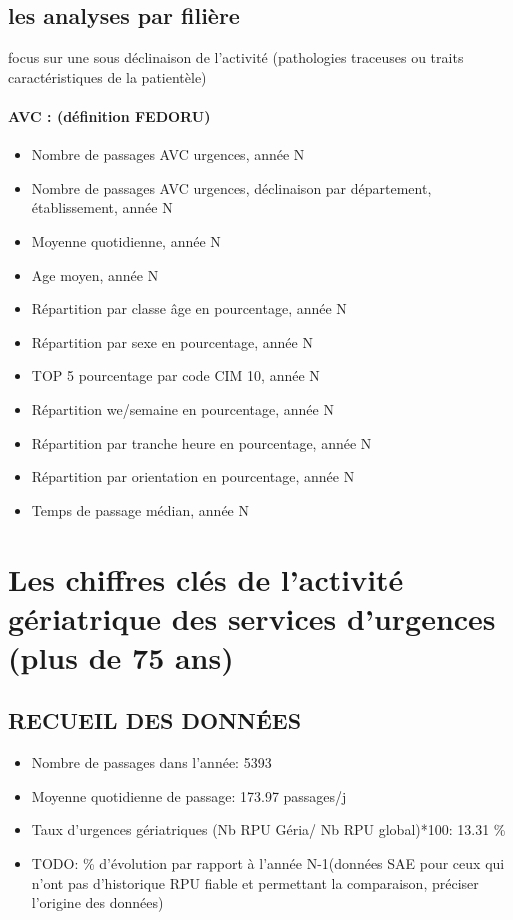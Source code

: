 \documentclass[]{article}
\begin{document}
\subsection{les analyses par filière}\label{les-analyses-par-filiere}

focus sur une sous déclinaison de l'activité (pathologies traceuses ou
traits caractéristiques de la patientèle)

\paragraph{AVC : (définition FEDORU)}\label{avc-definition-fedoru}

\begin{itemize}
\itemsep1pt\parskip0pt
\item
  Nombre de passages AVC urgences, année N
\item
  Nombre de passages AVC urgences, déclinaison par département,
  établissement, année N
\item
  Moyenne quotidienne, année N
\item
  Age moyen, année N
\item
  Répartition par classe âge en pourcentage, année N
\item
  Répartition par sexe en pourcentage, année N
\item
  TOP 5 pourcentage par code CIM 10, année N
\item
  Répartition we/semaine en pourcentage, année N
\item
  Répartition par tranche heure en pourcentage, année N
\item
  Répartition par orientation en pourcentage, année N
\item
  Temps de passage médian, année N
\end{itemize}

\section{Les chiffres clés de l'activité gériatrique des services
d'urgences (plus de 75
ans)}\label{les-chiffres-cles-de-lactivite-geriatrique-des-services-durgences-plus-de-75-ans}

\subsection{RECUEIL DES DONNÉES}\label{recueil-des-donnees-1}

\begin{itemize}
\itemsep1pt\parskip0pt
\item
  Nombre de passages dans l'année: 5393
\item
  Moyenne quotidienne de passage: 173.97 passages/j
\item
  Taux d'urgences gériatriques (Nb RPU Géria/ Nb RPU global)*100: 13.31
  \%
\item
  TODO: \% d'évolution par rapport à l'année N-1(données SAE pour ceux
  qui n'ont pas d'historique RPU fiable et permettant la comparaison,
  préciser l'origine des données)
\end{itemize}
\end{document}

